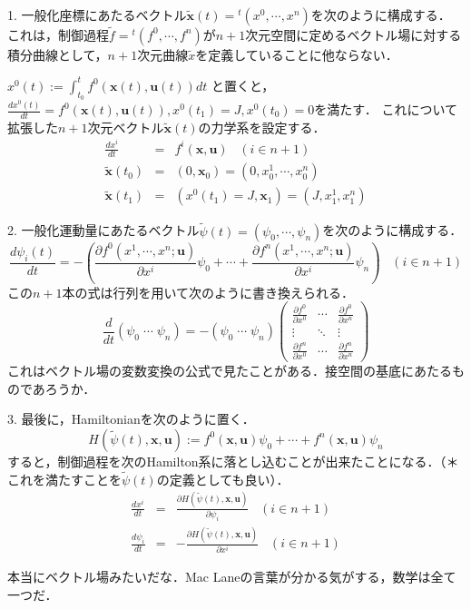 \documentclass[uplatex,dvipdfmx]{jsreport}
\begin{document}
\begin{remark}[Hamilton系への換言]　
    
    1. 一般化座標にあたるベクトル$\tilde{\mathbf{x}}(t)={}^t(x^0,\cdots,x^n)$を次のように構成する．
    これは，制御過程$\tilde{f}={}^t(f^0,\cdots,f^n)$が$n+1$次元空間に定めるベクトル場に対する積分曲線として，$n+1$次元曲線$\tilde{x}$を定義していることに他ならない．

    $x^0(t):=\int^t_{t_0}f^0(\mathbf{x}(t),\mathbf{u}(t))dt$
    と置くと，$\frac{dx^0(t)}{dt}=f^0(\mathbf{x}(t),\mathbf{u}(t)), x^0(t_1)=J,x^0(t_0)=0$を満たす．
    これについて拡張した$n+1$次元ベクトル$\tilde{\mathbf{x}}(t)$の力学系を設定する．
    \begin{eqnarray*}
        \frac{dx^i}{dt} &=& f^i(\mathbf{x},\mathbf{u})\;\;\;(i\in n+1) \\
        \tilde{\mathbf{x}}(t_0)&=& (0,\mathbf{x}_0) = (0,x_0^1,\cdots,x_0^n) \\
        \tilde{\mathbf{x}}(t_1) &=& (x^0(t_1)=J,\mathbf{x}_1) = (J,x^1_1,x^n_1)
    \end{eqnarray*}

    2. 一般化運動量にあたるベクトル$\tilde{\psi}(t)=(\psi_0,\cdots,\psi_n)$を次のように構成する．
    \[ \frac{d\psi_i(t)}{dt} = -\left( \frac{\partial f^0 (x^1,\cdots,x^n;\mathbf{u})}{\partial x^i} \psi_0 +\cdots + \frac{\partial f^n (x^1,\cdots,x^n;\mathbf{u})}{\partial x^i} \psi_n  \right) \;\;\;(i\in n+1) \]
    この$n+1$本の式は行列を用いて次のように書き換えられる．
    \[ \frac{d}{dt}(\psi_0\;\cdots\;\psi_n) = -  (\psi_0\;\cdots\;\psi_n) \left(\begin{array}{lcr}\frac{\partial f^0}{\partial x^0}&\cdots&\frac{\partial f^0}{\partial x^n} \\ \vdots&\ddots&\vdots \\ \frac{\partial f^n}{\partial x^0} & \cdots & \frac{\partial f^n}{\partial x^n}\end{array}\right) \]
    これはベクトル場の変数変換の公式で見たことがある．接空間の基底にあたるものであろうか．

    3. 最後に，Hamiltonianを次のように置く．
    \[ H(\tilde{\psi}(t),\mathbf{x},\mathbf{u}):=f^0(\mathbf{x},\mathbf{u})\psi_0 + \cdots + f^n(\mathbf{x},\mathbf{u})\psi_n \]
    すると，制御過程を次のHamilton系に落とし込むことが出来たことになる．（＊これを満たすことを$\tilde{\psi}(t)$の定義としても良い）．
    \begin{eqnarray*}
        \frac{dx^i}{dt} &=& \frac{\partial H(\tilde{\psi}(t),\mathbf{x},\mathbf{u})}{\partial\psi_i}\;\;\; (i\in n+1) \\
        \frac{d\psi_i}{dt} &=& -\frac{\partial H(\tilde{\psi}(t),\mathbf{x},\mathbf{u})}{\partial x^i}\;\;\; (i\in n+1)
    \end{eqnarray*}
\end{remark}
\begin{remark}
    本当にベクトル場みたいだな．Mac Laneの言葉が分かる気がする，数学は全て一つだ．
\end{remark}
\end{document}
